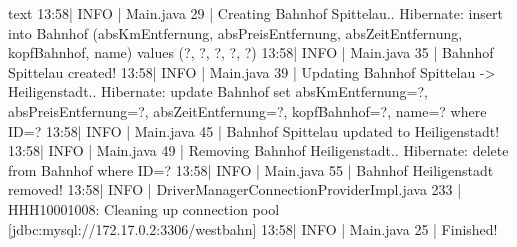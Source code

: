 \begin{code}{text}
13:58| INFO | Main.java 29 | Creating Bahnhof Spittelau..
Hibernate:
    insert
    into
        Bahnhof
        (absKmEntfernung, absPreisEntfernung, absZeitEntfernung, kopfBahnhof, name)
    values
        (?, ?, ?, ?, ?)
13:58| INFO | Main.java 35 | Bahnhof Spittelau created!
13:58| INFO | Main.java 39 | Updating Bahnhof Spittelau -> Heiligenstadt..
Hibernate:
    update
        Bahnhof
    set
        absKmEntfernung=?,
        absPreisEntfernung=?,
        absZeitEntfernung=?,
        kopfBahnhof=?,
        name=?
    where
        ID=?
13:58| INFO | Main.java 45 | Bahnhof Spittelau updated to Heiligenstadt!
13:58| INFO | Main.java 49 | Removing Bahnhof Heiligenstadt..
Hibernate:
    delete
    from
        Bahnhof
    where
        ID=?
13:58| INFO | Main.java 55 | Bahnhof Heiligenstadt removed!
13:58| INFO | DriverManagerConnectionProviderImpl.java 233 | HHH10001008: Cleaning up connection pool [jdbc:mysql://172.17.0.2:3306/westbahn]
13:58| INFO | Main.java 25 | Finished!
\end{code}

